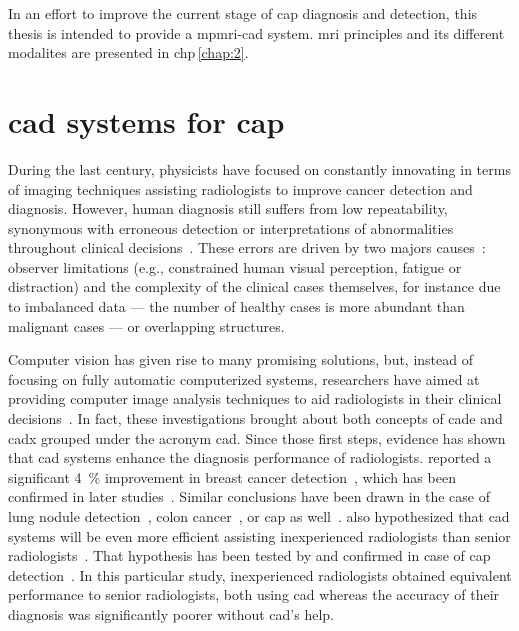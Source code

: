 In an effort to improve the current stage of \ac{cap} diagnosis and detection, this thesis is intended to provide a \ac{mpmri}-\acs{cad} system. 
\ac{mri} principles and its different modalites are presented in \acs{chp}\,\ref{chap:2}. 

\section{\acs*{cad} systems for \acs*{cap}}\label{sec:intro:cad} 
During the last century, physicists have focused on constantly innovating in terms of imaging techniques assisting radiologists to improve cancer detection and diagnosis.
However, human diagnosis still suffers from low repeatability, synonymous with erroneous detection or interpretations of abnormalities throughout clinical decisions~\cite{Giger2008,Hambrock2013}.
These errors are driven by two majors causes~\cite{Giger2008}: observer limitations (e.g., constrained human visual perception, fatigue or distraction) and the complexity of the clinical cases themselves, for instance due to imbalanced data --- the number of healthy cases is more abundant than malignant cases --- or overlapping structures.

Computer vision has given rise to many promising solutions, but, instead of focusing on fully automatic computerized systems, researchers have aimed at providing computer image analysis techniques to aid radiologists in their clinical decisions~\cite{Giger2008}.
In fact, these investigations brought about both concepts of \ac{cade} and \ac{cadx} grouped under the acronym \ac{cad}.
Since those first steps, evidence has shown that \ac{cad} systems enhance the diagnosis performance of radiologists.
\citeauthor{Chan1999} reported a significant \SI{4}{\percent} improvement in breast cancer detection~\cite{Chan1999}, which has been confirmed in later studies~\cite{Dean2006}.
Similar conclusions have been drawn in the case of lung nodule detection~\cite{Li2004}, colon cancer~\cite{Petrick2008}, or \ac{cap} as well~\cite{Hambrock2013}.
\citeauthor{Chan1999} also hypothesized that \acs{cad} systems will be even more efficient assisting inexperienced radiologists than senior radiologists~\cite{Chan1999}.
That hypothesis has been tested by \citeauthor{Hambrock2013} and confirmed in case of \ac{cap} detection~\cite{Hambrock2013}.
In this particular study, inexperienced radiologists obtained equivalent performance to senior radiologists, both using \acs{cad} whereas the accuracy of their diagnosis was significantly poorer without \ac{cad}'s help.

